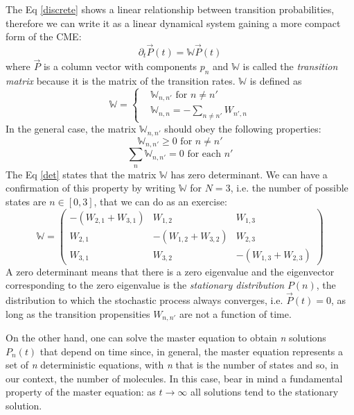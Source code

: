 \documentclass[12pt,a4paper]{report}
\begin{document}
 The Eq \ref{discrete} shows a linear relationship between transition probabilities, therefore we can write it as a linear dynamical system gaining a more compact form of the CME:
\begin{equation}
    \partial_{t}\Vec{P}(t) = \mathbb{W} \Vec{P}(t)
\end{equation}
where $\Vec{P}$ is a column vector with components $p_{n}$ and $\mathbb{W}$ is called the \emph{transition matrix} because it is the matrix of the transition rates. $\mathbb{W}$ is defined as
\begin{equation}
\mathbb{W} =
\begin{cases}
    & \mathbb{W}_{n,n'} \textrm{ for } n \neq n' \\
    & \mathbb{W}_{n,n} = - \sum_{n \neq n'} W_{n',n}
    
\end{cases}
\end{equation}
In the general case, the matrix $\mathbb{W}_{n,n'}$ should obey the following properties:
    \begin{equation}
    \mathbb{W}_{n,n'} \geq 0 \textrm{ for } n \neq n'
\end{equation}
\begin{equation}\label{det}
        \sum_{n} \mathbb{W}_{n,n'} = 0 \textrm{ for each }  n'
\end{equation}
The Eq \ref{det} states that the matrix $\mathbb{W}$ has zero determinant. We can have a confirmation of this property by writing $\mathbb{W}$ for $N = 3$, i.e. the number of possible states are $n \in [0,3]$, that we can do as an exercise:
\begin{equation}
\mathbb{W} =
\begin{pmatrix}
-(W_{2,1}+W_{3,1}) & W_{1,2} & W_{1,3}\\
W_{2,1} & -(W_{1,2}+W_{3,2}) & W_{2,3} \\
W_{3,1} & W_{3,2} & -(W_{1,3}+W_{2,3})
\end{pmatrix}
\end{equation}
A zero determinant means that there is a zero eigenvalue and the eigenvector corresponding to the zero eigenvalue is the \emph{stationary distribution} $P(n)$, the distribution to which the stochastic process always converges, i.e. $\Vec{P}(t) = 0$, as long as the transition propensities $W_{n,n'}$ are not a function of time. 


On the other hand, one can solve the master equation to obtain \emph{n} solutions $P_{n}(t)$ that depend on time since, in general, the master equation represents a set of \emph{n} deterministic equations, with \emph{n} that is the number of states and so, in our context, the number of molecules. In this case, bear in mind a fundamental property of the master equation: as $t \rightarrow \infty$ all solutions tend to the stationary solution.
\end{document}
